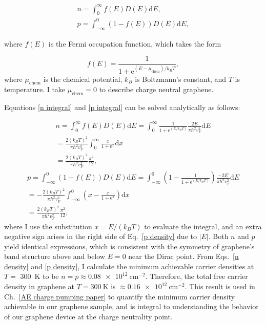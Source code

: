 \documentclass{beavtex_dub_edit}
\begin{document}
\begin{gather}
        n = \int_{0}^{\infty}f(E) D(E)\mathrm{d}E, \label{n integral} \\ 
        p = \int_{-\infty}^{0}(1- f(E)) D(E)\mathrm{d}E, \label{p integral}
\end{gather}

where $f(E)$ is the Fermi occupation function, which takes the form

\begin{equation}
    f(E) = \frac{1}{1+\mathrm{e}^{(E-\mu_{\mathrm{chem}})/k_B T}},
\end{equation}
where $\mu_{\mathrm{chem}}$ is the chemical potential, $k_B$ is Boltzmann's constant, and $T$ is temperature. I take $\mu_{\mathrm{chem}} = 0$ to describe charge neutral graphene. 

Equations \ref{n integral} and \ref{p integral} can be solved analytically as follows:

\begin{equation}
    \begin{split}
        n = \int_{0}^{\infty}f(E) D(E)\mathrm{d}E 
        = \int_{0}^{\infty}\frac{1}{1+\mathrm{e}^{(E/k_B T)}} \frac{2E}{\pi \hbar^2 v_F^2}\mathrm{d}E \\
        = \frac{2(k_B T)^2}{\pi \hbar^2 v_F^2}\int_{0}^{\infty}\frac{x}{1+\mathrm{e}^{x}}\mathrm{d}x \\
        = \frac{2(k_B T)^2}{\pi\hbar^2 v_F^2} \frac{\pi^2}{12}, \label{n density}
    \end{split}
\end{equation}
\begin{equation}
    \begin{split}
        p = \int_{-\infty}^{0}(1-f(E)) D(E)\mathrm{d}E 
        = \int_{-\infty}^{0}\left( 1 -\frac{1}{1+\mathrm{e}^{(E/k_B T)}} \right) \frac{-2E}{\pi \hbar^2 v_F^2}\mathrm{d}E \\
        = -\frac{2(k_B T)^2}{\pi \hbar^2 v_F^2}\int_{-\infty}^{0}\left(x - \frac{x}{1+\mathrm{e}^{x}}\right)\mathrm{d}x \\
        = \frac{2(k_B T)^2}{\pi\hbar^2 v_F^2} \frac{\pi^2}{12}, \label{p density}
    \end{split}
\end{equation}
where I use the substitution $x = E/(k_B T)$ to evaluate the integral, and an extra negative sign arises in the right side of Eq.\ \ref{p density} due to $|E|$. Both $n$ and $p$ yield identical expressions, which is consistent with the symmetry of graphene's band structure above and below $E = 0$ near the Dirac point. From Eqs.\ \ref{n density} and \ref{p density}, I calculate the minimum achievable carrier densities at $T = $ \SI{300}{\kelvin} to be $n = p \approx \SI{0.08e12}{\centi\meter^{-2}}$. Therefore, the total free carrier density in graphene at $T =  \SI{300}{\kelvin}$ is $\approx \SI{0.16e12}{\centi\meter^{-2}}$. This result is used in Ch.\ \ref{AE charge pumping paper} to quantify the minimum carrier density achievable in our graphene sample, and is integral to understanding the behavior of our graphene device at the charge neutrality point.
\end{document}

